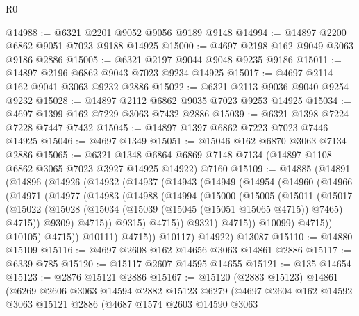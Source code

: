 \begin{lexlean}{R0}
\begin{coremodule}
@14988 := @6321 @2201 @9052 @9056 @9189 @9148
@14994 := @14897 @2200 @6862 @9051 @7023 @9188 @14925
@15000 := @4697 @2198 @162 @9049 @3063 @9186 @2886
@15005 := @6321 @2197 @9044 @9048 @9235 @9186
@15011 := @14897 @2196 @6862 @9043 @7023 @9234 @14925
@15017 := @4697 @2114 @162 @9041 @3063 @9232 @2886
@15022 := @6321 @2113 @9036 @9040 @9254 @9232
@15028 := @14897 @2112 @6862 @9035 @7023 @9253 @14925
@15034 := @4697 @1399 @162 @7229 @3063 @7432 @2886
@15039 := @6321 @1398 @7224 @7228 @7447 @7432
@15045 := @14897 @1397 @6862 @7223 @7023 @7446 @14925
@15046 := @4697 @1349
@15051 := @15046 @162 @6870 @3063 @7134 @2886
@15065 := @6321
    @1348
    @6864
    @6869
    @7148
    @7134
    (@14897 @1108 @6862 @3065 @7023 @3927 @14925 @14922)
    @7160
@15109 := @14885
    (@14891
      (@14896
        (@14926
          (@14932
            (@14937
              (@14943
                (@14949
                  (@14954
                    (@14960
                      (@14966
                        (@14971
                          (@14977
                            (@14983
                              (@14988
                                (@14994
                                  (@15000
                                    (@15005
                                      (@15011
                                        (@15017
                                          (@15022
                                            (@15028
                                              (@15034
                                                (@15039 (@15045 (@15051 @15065 @4715)) @7465)
                                                @4715))
                                            @9309)
                                          @4715))
                                      @9315)
                                    @4715))
                                @9321)
                              @4715))
                          @10099)
                        @4715))
                    @10105)
                  @4715))
              @10111)
            @4715))
        @10117)
      @14922)
    @13087
@15110 := @14880 @15109
@15116 := @4697 @2608 @162 @14656 @3063 @14861 @2886
@15117 := @6339 @785
@15120 := @15117 @2607 @14595 @14655
@15121 := @135 @14654
@15123 := @2876 @15121 @2886
@15167 := @15120
    (@2883 @15123)
    @14861
    (@6269
      @2606
      @3063
      @14594
      @2882
      @15123
      @6279
      (@4697
        @2604
        @162
        @14592
        @3063
        @15121
        @2886
        (@4687
          @1574
          @2603
          @14590
          @3063

\end{coremodule}
\end{lexlean}
